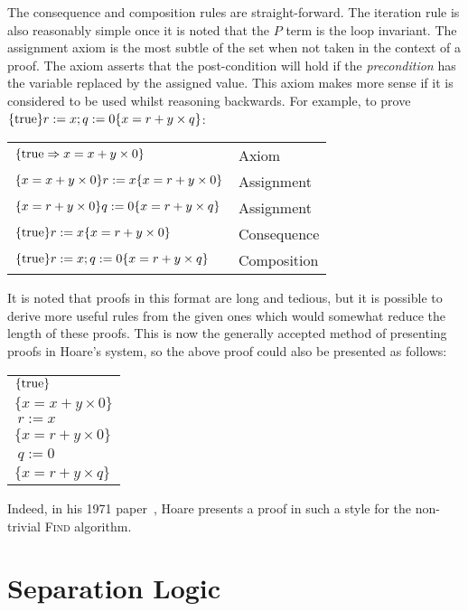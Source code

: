 \documentclass[a4paper,notitlepage]{report}
\begin{document}
  The consequence and composition rules are straight-forward. The iteration rule
  is also reasonably simple once it is noted that the $P$ term is the loop
  invariant. The assignment axiom is the most subtle of the set when not taken
  in the context of a proof. The axiom asserts that the post-condition will hold
  if the \emph{precondition} has the variable replaced by
  the assigned value. This axiom makes more sense if it is considered to be used
  whilst reasoning backwards. For example, to prove $\{\text{true}\}r := x; q :=
  0\{x = r + y \times q\}$:

  \begin{tabular}{ll}
    $\{\text{true} \Rightarrow x = x + y \times 0 \}$ & Axiom \\
    $\{x = x + y \times 0\}r:=x\{x = r + y \times 0\}$ & Assignment \\
    $\{x = r + y \times 0\}q:=0\{x = r + y \times q\}$ & Assignment \\
    $\{\text{true}\}r:=x\{x = r + y \times 0\}$ & Consequence \\
    $\{\text{true}\}r:=x; q:=0\{x = r + y \times q\}$ & Composition\\
  \end{tabular}

  It is noted that proofs in this format are long and tedious, but it is
  possible to derive more useful rules from the given ones which would somewhat
  reduce the length of these proofs. This is now the generally accepted method
  of presenting proofs in Hoare's system, so the above proof could also be
  presented as follows:

  \begin{tabular}{l}
    $\{\text{true}\}$ \\
    $\{x = x + y \times 0\}$ \\
    $\ r:=x$ \\
    $\{x = r + y \times 0\}$ \\
    $\ q:=0$ \\
    $\{x = r + y \times q\}$
  \end{tabular}

  Indeed, in his 1971 paper~\cite{Hoare1971proof}, Hoare presents a proof in
  such a style for the non-trivial \textsc{Find} algorithm.


\section{Separation Logic}
\end{document}
